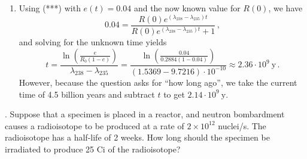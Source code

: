 {\begin{enumerate}[label=(\alph*)]
\item Using (***) with $e(t)=0.04$ and the now known value for $R(0)$, we have
\begin{equation*}
 0.04 = \frac{ R(0) e^{(\lambda_{238}-\lambda_{235})t}}
  {R(0) e^{(\lambda_{238}-\lambda_{235}) t}+ 1} \, ,
\end{equation*}
and solving for the unknown time yields
\begin{equation*}
  t = \frac{\ln{ \left ( \frac{e}{R_0 (1-e)}\right )}  }{\lambda_{238}-\lambda_{235}}
    =  \frac{\ln{ \left ( \frac{0.04}{0.2884 (1-0.04)}\right )}  }{(1.5369-9.7216)\cdot 10^{-10}}
    \approx \boxed{2.36\cdot 10^9~\text{y}} \, .
\end{equation*}
However, because the question asks for ``how long ago'', we take the current time of 4.5 billion years and subtract $t$ to get $\boxed{2.14\cdot 10^{9}~\text{y}}$.



\end{enumerate}

}
\newpage
\else
\fi



.
Suppose that a specimen is placed in a reactor, and neutron
bombardment causes a radioisotope to be produced at a rate of
$2\times 10^{12}$ nuclei/s. The radioisotope has a half-life of 2 weeks.
How long should the specimen be irradiated to produce 25 Ci of
the radioisotope?

